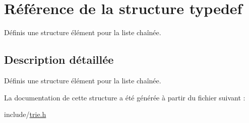 \hypertarget{structtypedef}{\section{Référence de la structure typedef}
\label{structtypedef}
}


Définis une structure élément pour la liste chaînée.  




\subsection{Description détaillée}
Définis une structure élément pour la liste chaînée. 

La documentation de cette structure a été générée à partir du fichier suivant \+:\begin{DoxyCompactItemize}
\item 
include/\hyperlink{trie_8h}{trie.\+h}\end{DoxyCompactItemize}
